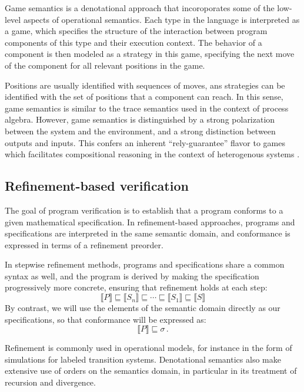 Game semantics is a denotational approach that
incoroporates some of the low-level aspects of operational semantics.
Each type in the language
is interpreted as a game,
which specifies the structure of the interaction
between program components of this type
and their execution context.
The behavior of a component
is then modeled as a strategy in this game,
specifying the next move of the component
for all relevant positions in the game.

Positions are usually identified with sequences of moves,
ans strategies can be identified with the set of positions
that a component can reach.
In this sense,
game semantics is similar to
the trace semantics used in the context of process algebra.
However, game semantics is distinguished
by a strong polarization between
the system and the environment,
and a strong distinction between outputs and inputs.
This confers an inherent ``rely-guarantee'' flavor
to games which facilitates compositional reasoning
in the context of heterogenous systems \cite{cspgs}.


\subsection{Refinement-based verification} %

The goal of program verification
is to establish that a program conforms
to a given mathematical specification.
In refinement-based approaches,
programs and specifications are interpreted in the same
semantic domain,
and conformance is expressed in terms of a
refinement preorder.

In stepwise refinement methods,
programs and specifications share a common syntax as well,
and the program is derived
by making the specification progressively more concrete,
ensuring that refinement holds at each step:
\[ \llbracket P \rrbracket \sqsubseteq
   \llbracket S_n \rrbracket \sqsubseteq
   \cdots \sqsubseteq
   \llbracket S_1 \rrbracket \sqsubseteq
   \llbracket S \rrbracket \]
By contrast,
we will use the elements of the semantic domain
directly as our specifications,
so that conformance will be expressed as:
\[ \llbracket P \rrbracket \sqsubseteq \sigma \,. \]

Refinement is commonly used in operational models,
for instance in the form of simulations
for labeled transition systems.
Denotational semantics also make extensive use of
orders on the semantics domain,
in particular in its treatment of recursion and divergence.

